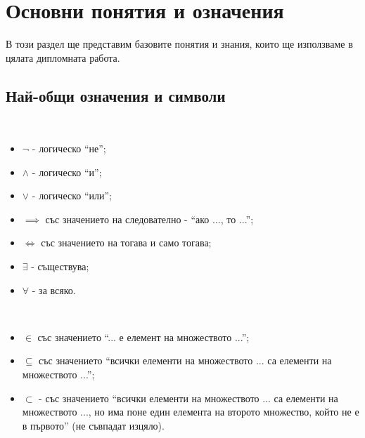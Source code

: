 \documentclass[12pt,twoside,a4paper]{article}
\begin{document}
	\newpage
	
	\section{Основни понятия и означения}
	\thispagestyle{style}
	
	В този раздел ще представим базовите понятия и знания, които ще използваме в цялата дипломната работа.
	
	\subsection{Най-общи означения и символи}
	\begin{denotations}~
		\begin{itemize}
			\item $\lnot$ - логическо "`не"';
			\item $\land$ - логическо "`и"';
			\item $\lor$ - логическо "`или"';
			\item $\implies$ със значението на следователно - "`ако ..., то ..."';
			\item $\iff$ със значението на тогава и само тогава;
			\item $\exists$ - съществува;
			\item $\forall$ - за всяко.
		\end{itemize}
	\end{denotations}
	
	\begin{denotations}~
		\begin{itemize}
			\item $\in$ със значението "`... е елемент на множеството ..."';
			\item $\subseteq$ със значението "`всички елементи на множеството ... са елементи на множеството ..."';
			\item $\subset$ - със значението "`всички елементи на множеството ... са елементи на множеството ..., но има поне един елемента на второто множество, който не е в първото"' (не съвпадат изцяло).
		\end{itemize}
	\end{denotations}
	
\end{document}
